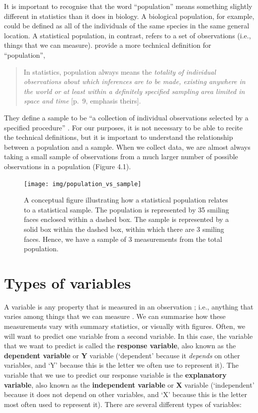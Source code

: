 \documentclass[
  openany]{scrbook}
\begin{document}
It is important to recognise that the word ``population'' means something slightly different in statistics than it does in biology.
A biological population, for example, could be defined as all of the individuals of the same species in the same general location.
A statistical population, in contrast, refers to a set of observations (i.e., things that we can measure).
\citet{Sokal1995} provide a more technical definition for ``population'',

\begin{quote}
In statistics, population always means the \emph{totality of individual observations about which inferences are to be made, existing anywhere in the world or at least within a definitely specified sampling area limited in space and time} {[}p.~9, emphasis theirs{]}.
\end{quote}

They define a sample to be ``a collection of individual observations selected by a specified procedure'' \citep{Sokal1995}.
For our purposes, it is not necessary to be able to recite the technical definitions, but it is important to understand the relationship between a population and a sample.
When we collect data, we are almost always taking a small sample of observations from a much larger number of possible observations in a population (Figure 4.1).

\begin{figure}
\texttt{[image: img/population\_vs\_sample]} \caption{A conceptual figure illustrating how a statistical population relates to a statistical sample. The population is represented by 35 smiling faces enclosed within a dashed box. The sample is represented by a solid box within the dashed box, within which there are 3 smiling faces. Hence, we have a sample of 3 measurements from the total population.}\label{fig:unnamed-chunk-21}
\end{figure}

\hypertarget{Chapter_5}{%
\chapter{Types of variables}\label{Chapter_5}}

A variable is any property that is measured in an observation \citep{Sokal1995}; i.e., anything that varies among things that we can measure \citep{Dytham2011}.
We can summarise how these measurements vary with summary statistics, or visually with figures.
Often, we will want to predict one variable from a second variable.
In this case, the variable that we want to predict is called the \textbf{response variable}, also known as the \textbf{dependent variable} or \textbf{Y} variable (`dependent' because it \emph{depends} on other variables, and `Y' because this is the letter we often use to represent it).
The variable that we use to predict our response variable is the \textbf{explanatory variable}, also known as the \textbf{independent variable} or \textbf{X} variable (`independent' because it does not depend on other variables, and `X' because this is the letter most often used to represent it).
There are several different types of variables:
\end{document}
